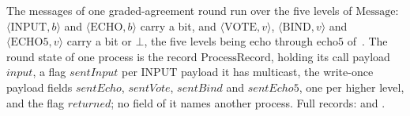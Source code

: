 \begin{definition}
  \label{def:aba-gbca-vocab}
  \leanok
  The messages of one graded-agreement round run over the five levels of $\mathrm{Message}$: $\langle\mathrm{INPUT},b\rangle$ and $\langle\mathrm{ECHO},b\rangle$ carry a bit, and $\langle\mathrm{VOTE},v\rangle$, $\langle\mathrm{BIND},v\rangle$ and $\langle\mathrm{ECHO5},v\rangle$ carry a bit or $\bot$, the five levels being $\mathrm{echo}$ through $\mathrm{echo5}$ of~\cite{ABDY22}.
  The round state of one process is the record $\mathrm{ProcessRecord}$, holding its call payload $\mathit{input}$, a flag $\mathit{sentInput}$ per $\mathrm{INPUT}$ payload it has multicast, the write-once payload fields $\mathit{sentEcho}$, $\mathit{sentVote}$, $\mathit{sentBind}$ and $\mathit{sentEcho5}$, one per higher level, and the flag $\mathit{returned}$; no field of it names another process.
  Full records:  and .
\end{definition}
